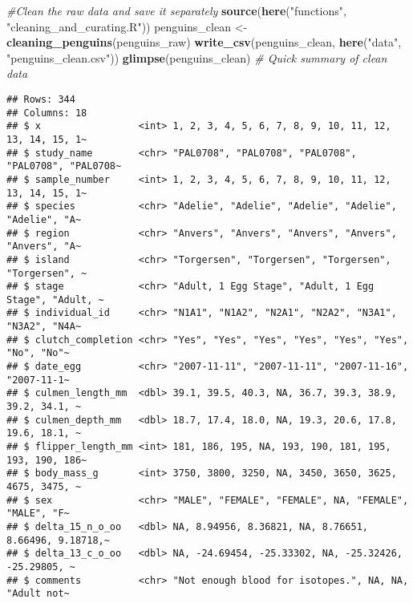 \documentclass[
]{article}
\newenvironment{Shaded}{\begin{snugshade}}{\end{snugshade}}
\newcommand{\CommentTok}[1]{\textcolor[rgb]{0.56,0.35,0.01}{\textit{#1}}}
\newcommand{\FunctionTok}[1]{\textcolor[rgb]{0.13,0.29,0.53}{\textbf{#1}}}
\newcommand{\NormalTok}[1]{#1}
\newcommand{\OtherTok}[1]{\textcolor[rgb]{0.56,0.35,0.01}{#1}}
\newcommand{\StringTok}[1]{\textcolor[rgb]{0.31,0.60,0.02}{#1}}
\begin{document}
\begin{Shaded}
\begin{Highlighting}[]
\CommentTok{\#Clean the raw data and save it separately}
\FunctionTok{source}\NormalTok{(}\FunctionTok{here}\NormalTok{(}\StringTok{"functions"}\NormalTok{, }\StringTok{"cleaning\_and\_curating.R"}\NormalTok{))}
\NormalTok{penguins\_clean }\OtherTok{\textless{}{-}} \FunctionTok{cleaning\_penguins}\NormalTok{(penguins\_raw)}
\FunctionTok{write\_csv}\NormalTok{(penguins\_clean, }\FunctionTok{here}\NormalTok{(}\StringTok{"data"}\NormalTok{, }\StringTok{"penguins\_clean.csv"}\NormalTok{))}
\FunctionTok{glimpse}\NormalTok{(penguins\_clean) }\CommentTok{\# Quick summary of clean data}
\end{Highlighting}
\end{Shaded}

\begin{verbatim}
## Rows: 344
## Columns: 18
## $ x                 <int> 1, 2, 3, 4, 5, 6, 7, 8, 9, 10, 11, 12, 13, 14, 15, 1~
## $ study_name        <chr> "PAL0708", "PAL0708", "PAL0708", "PAL0708", "PAL0708~
## $ sample_number     <int> 1, 2, 3, 4, 5, 6, 7, 8, 9, 10, 11, 12, 13, 14, 15, 1~
## $ species           <chr> "Adelie", "Adelie", "Adelie", "Adelie", "Adelie", "A~
## $ region            <chr> "Anvers", "Anvers", "Anvers", "Anvers", "Anvers", "A~
## $ island            <chr> "Torgersen", "Torgersen", "Torgersen", "Torgersen", ~
## $ stage             <chr> "Adult, 1 Egg Stage", "Adult, 1 Egg Stage", "Adult, ~
## $ individual_id     <chr> "N1A1", "N1A2", "N2A1", "N2A2", "N3A1", "N3A2", "N4A~
## $ clutch_completion <chr> "Yes", "Yes", "Yes", "Yes", "Yes", "Yes", "No", "No"~
## $ date_egg          <chr> "2007-11-11", "2007-11-11", "2007-11-16", "2007-11-1~
## $ culmen_length_mm  <dbl> 39.1, 39.5, 40.3, NA, 36.7, 39.3, 38.9, 39.2, 34.1, ~
## $ culmen_depth_mm   <dbl> 18.7, 17.4, 18.0, NA, 19.3, 20.6, 17.8, 19.6, 18.1, ~
## $ flipper_length_mm <int> 181, 186, 195, NA, 193, 190, 181, 195, 193, 190, 186~
## $ body_mass_g       <int> 3750, 3800, 3250, NA, 3450, 3650, 3625, 4675, 3475, ~
## $ sex               <chr> "MALE", "FEMALE", "FEMALE", NA, "FEMALE", "MALE", "F~
## $ delta_15_n_o_oo   <dbl> NA, 8.94956, 8.36821, NA, 8.76651, 8.66496, 9.18718,~
## $ delta_13_c_o_oo   <dbl> NA, -24.69454, -25.33302, NA, -25.32426, -25.29805, ~
## $ comments          <chr> "Not enough blood for isotopes.", NA, NA, "Adult not~
\end{verbatim}
\end{document}
